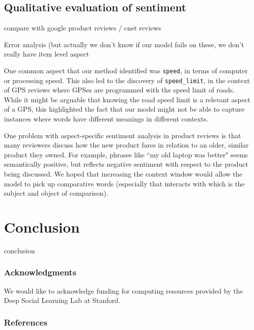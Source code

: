 \documentclass{article} %
\begin{document}
\subsection{Qualitative evaluation of sentiment}

compare with google product reviews / cnet reviews

Error analysis (but actually we don't know if our model fails on these, we don't really have item level aspect

One common aspect that our method identified was \texttt{speed}, in terms of computer or processing speed. This also led to the discovery of \texttt{speed\_limit}, in the context of GPS reviews where GPSes are programmed with the speed limit of roads. While it might be arguable that knowing the road speed limit is a relevant aspect of a GPS, this highlighted the fact that our model might not be able to capture instances where words have different meanings in different contexts.

One problem with aspect-specific sentiment analysis in product reviews is that many reviewers discuss how the new product fares in relation to an older, similar product they owned. For example, phrases like ``my old laptop was better" seems semantically positive, but reflects negative sentiment with respect to the product being discussed. We hoped that increasing the context window would allow the model to pick up comparative words (especially that interacts with which is the subject and object of comparison).



\section{Conclusion}

conclusion







\subsubsection*{Acknowledgments}

We would like to acknowledge funding for computing resources provided by the Deep Social Learning Lab at Stanford.

\subsubsection*{References} %
\end{document}
